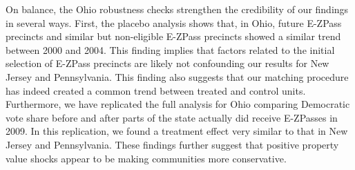 \documentclass[11.0pt]{article}
\theoremstyle{definition}
\begin{document}
On balance, the Ohio robustness checks strengthen the credibility of our findings in several ways. First, the placebo analysis shows that, in Ohio, future E-ZPass precincts and similar but non-eligible E-ZPass precincts showed a similar trend between 2000 and 2004. This finding implies that factors related to the initial selection of E-ZPass precincts are likely not confounding our results for New Jersey and Pennsylvania. This finding also suggests that our matching procedure has indeed created a common trend between treated and control units. Furthermore, we have replicated the full analysis for Ohio comparing Democratic vote share before and after parts of the state actually did receive E-ZPasses in 2009. In this replication, we found a treatment effect very similar to that in New Jersey and Pennsylvania. These findings further suggest that positive property value shocks appear to be making communities more conservative. 
\end{document}
